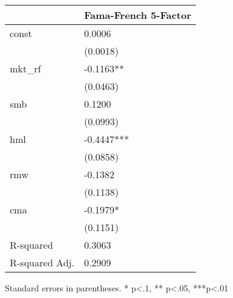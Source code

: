 \begin{table}
\caption{}
\label{}
\begin{center}
\begin{tabular}{ll}
\hline
               & Fama-French 5-Factor  \\
\hline
const          & 0.0006                \\
               & (0.0018)              \\
mkt\_rf        & -0.1163**             \\
               & (0.0463)              \\
smb            & 0.1200                \\
               & (0.0993)              \\
hml            & -0.4447***            \\
               & (0.0858)              \\
rmw            & -0.1382               \\
               & (0.1138)              \\
cma            & -0.1979*              \\
               & (0.1151)              \\
R-squared      & 0.3063                \\
R-squared Adj. & 0.2909                \\
\hline
\end{tabular}
\end{center}
\end{table}
\bigskip
Standard errors in parentheses. \newline 
* p<.1, ** p<.05, ***p<.01